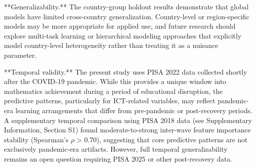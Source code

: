 \documentclass[pdflatex,sn-mathphys-ay]{sn-jnl}
\begin{document}
**Generalizability.** The country-group holdout results demonstrate that global models have limited cross-country generalization. Country-level or region-specific models may be more appropriate for applied use, and future research should explore multi-task learning or hierarchical modeling approaches that explicitly model country-level heterogeneity rather than treating it as a nuisance parameter.

**Temporal validity.** The present study uses PISA 2022 data collected shortly after the COVID-19 pandemic. While this provides a unique window into mathematics achievement during a period of educational disruption, the predictive patterns, particularly for ICT-related variables, may reflect pandemic-era learning arrangements that differ from pre-pandemic or post-recovery periods. A supplementary temporal comparison using PISA 2018 data (see Supplementary Information, Section S1) found moderate-to-strong inter-wave feature importance stability (Spearman's $\rho$ > 0.70), suggesting that core predictive patterns are not exclusively pandemic-era artifacts. However, full temporal generalizability remains an open question requiring PISA 2025 or other post-recovery data.
\end{document}
